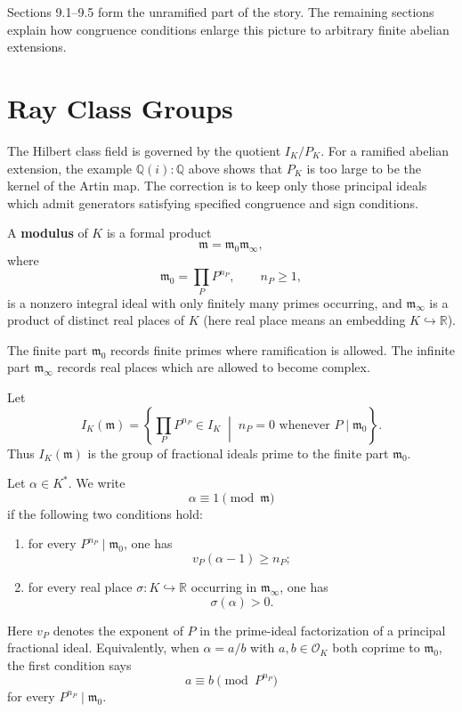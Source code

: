 \begin{remark}
Sections 9.1--9.5 form the unramified part of the story. The remaining sections explain how
congruence conditions enlarge this picture to arbitrary finite abelian extensions.
\end{remark}

\section{Ray Class Groups}

The Hilbert class field is governed by the quotient $I_K/P_K$. For a ramified abelian
extension, the example $\mathbb Q(i):\mathbb Q$ above shows that $P_K$ is too large to
be the kernel of the Artin map. The correction is to keep only those principal ideals which
admit generators satisfying specified congruence and sign conditions.

\begin{definition}
A {\bf modulus} of $K$ is a formal product
\[
\mathfrak m=\mathfrak m_0\mathfrak m_\infty,
\]
where
\[
\mathfrak m_0=\prod_P P^{n_P},
\qquad n_P\geq1,
\]
is a nonzero integral ideal with only finitely many primes occurring, and
$\mathfrak m_\infty$ is a product of distinct real places of $K$ (here real place means an embedding $K \hookrightarrow \mathbb{R}$).
\end{definition}

The finite part $\mathfrak m_0$ records finite primes where ramification is allowed. The
infinite part $\mathfrak m_\infty$ records real places which are allowed to become complex.

Let
\[
I_K(\mathfrak m)
=
\left\{\prod_P P^{n_P}\in I_K\;\middle|\; n_P=0
\text{ whenever }P\mid\mathfrak m_0\right\}.
\]
Thus $I_K(\mathfrak m)$ is the group of fractional ideals prime to the finite part
$\mathfrak m_0$.

\begin{definition}\label{def-rayCongruence}
Let $\alpha\in K^*$. We write
\[
\alpha\equiv1\pmod{\mathfrak m}
\]
if the following two conditions hold:
\begin{enumerate}
    \item for every $P^{n_P}\mid\mathfrak m_0$, one has
    \[
    v_P(\alpha-1)\geq n_P;
    \]
    \item for every real place $\sigma : K \hookrightarrow \mathbb R$ occurring in $\mathfrak m_\infty$, one has
    \[
    \sigma(\alpha)>0.
    \]
\end{enumerate}
Here $v_P$ denotes the exponent of $P$ in the prime-ideal factorization of a principal fractional ideal. Equivalently, when $\alpha=a/b$ with $a,b\in\mathcal O_K$ both coprime to
$\mathfrak m_0$, the first condition says
\[
a\equiv b\pmod{P^{n_P}}
\]
for every $P^{n_P}\mid\mathfrak m_0$.
\end{definition}

